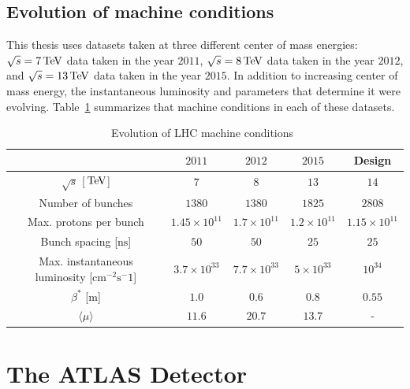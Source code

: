 \subsection{Evolution of machine conditions}

This thesis uses datasets taken at three different center of mass energies: $\sqrt{s} = 7 \TeV$ data taken in the year $2011$, $\sqrt{s} = 8 \TeV$ data taken in the year $2012$, and $\sqrt{s} = 13 \TeV$ data taken in the year $2015$. In addition to increasing center of mass energy, the instantaneous luminosity and parameters that determine it were evolving. Table~\ref{tab:LHC_cond} summarizes that machine conditions in each of these datasets. 

\begin{table}[h!]
\centering
\captionsetup{justification=centering}

\hspace{-10pt}
\begin{tabular}{|c|c|c|c|c|}
\hline
& $2011$ & $2012$ & $2015$ & Design\\ \hline
$\sqrt{s}$ [$\TeV$] & $7$ & $8$ & $13$ & $14$ \\ \hline
Number of bunches & $1380$ & $1380$ & $1825$ & $2808$ \\ \hline
Max. protons per bunch & $1.45\times10^{11}$ & $1.7\times10^{11}$ & $1.2 \times 10^{11}$ & $1.15 \times 10^{11}$ \\ \hline
Bunch spacing [$\textrm{ns}$] & $50$ & $50$ & $25$ & $25$ \\ \hline
\specialcell{Max. instantaneous \\ luminosity [$\textrm{cm}^{-2} \textrm{s}^-1$]} & $3.7\times 10^{33}$ & $7.7\times10^{33}$ & $5\times10^{33}$ & $10^{34}$\\ \hline
$\beta^*$ [$\textrm{m}$] & $1.0$ & $0.6$ & $0.8$ & $0.55$ \\ \hline 
$\langle \mu \rangle$ & $11.6$ & $20.7$ & $13.7$ & - \\ \hline
\end{tabular}

\caption{
Evolution of LHC machine conditions~\cite{LHC_2011_2012,LHC_2015}
}
\label{tab:LHC_cond}
\end{table}

\section{The ATLAS Detector}

